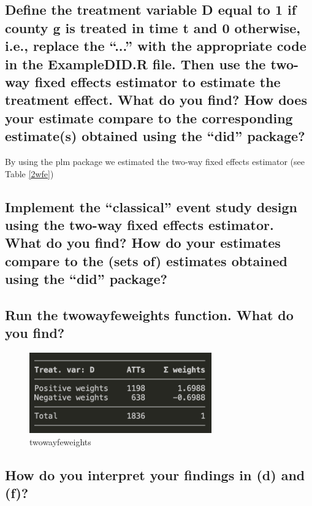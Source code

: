 \documentclass[12pt]{article}
\begin{document}
\subsection{Define the treatment variable D equal to 1 if county g is treated in time t and 0 otherwise, i.e., replace the “...” with the appropriate code in the ExampleDID.R file. Then use the two-way fixed effects estimator to estimate the treatment effect. What do you find? How does your estimate compare to the corresponding estimate(s) obtained using the “did” package?}

By using the plm package we estimated the two-way fixed effects estimator (see Table \ref{2wfe})
\subsection{Implement the “classical” event study design using the two-way fixed effects estimator. What do you find? How do your estimates compare to the (sets of) estimates obtained using the “did” package?}
\subsection{Run the twowayfeweights function. What do you find?}
\begin{figure}[htbp]
    \centering
    \includegraphics[width=0.7\textwidth]{media/2wfeg.png}
        \caption{twowayfeweights}
        \label{2wfew}
\end{figure}
\subsection{How do you interpret your findings in (d) and (f)?}
\end{document}
